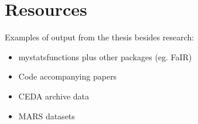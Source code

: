 \chapter{\label{resources}Resources}

Examples of output from the thesis besides research:
\begin{itemize}
    \item mystatsfunctions plus other packages (eg. FaIR)
    \item Code accompanying papers
    \item CEDA archive data
    \item MARS datasets
\end{itemize}